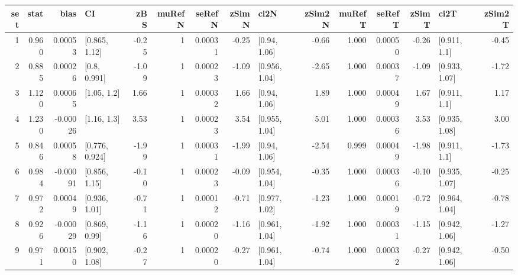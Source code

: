 
\begin{tabular}{r|r|r|l|r|r|r|r|l|r|r|r|r|l|r}
\hline
set & stat & bias & CI & zBS & muRefN & seRefN & zSimN & ci2N & zSim2N & muRefT & seRefT & zSimT & ci2T & zSim2T\\
\hline
1 & 0.960 & 0.00053 & [0.865, 1.12] & -0.25 & 1 & 0.00031 & -0.25 & [0.94, 1.06] & -0.66 & 1.000 & 0.00050 & -0.26 & [0.911, 1.1] & -0.45\\
\hline
2 & 0.885 & 0.00026 & [0.8, 0.991] & -1.09 & 1 & 0.00023 & -1.09 & [0.956, 1.04] & -2.65 & 1.000 & 0.00037 & -1.09 & [0.933, 1.07] & -1.72\\
\hline
3 & 1.120 & 0.00065 & [1.05, 1.2] & 1.66 & 1 & 0.00032 & 1.66 & [0.94, 1.06] & 1.89 & 1.000 & 0.00049 & 1.67 & [0.911, 1.1] & 1.17\\
\hline
4 & 1.230 & -0.00026 & [1.16, 1.3] & 3.53 & 1 & 0.00023 & 3.54 & [0.955, 1.04] & 5.01 & 1.000 & 0.00036 & 3.53 & [0.935, 1.08] & 3.00\\
\hline
5 & 0.846 & 0.00058 & [0.776, 0.924] & -1.99 & 1 & 0.00031 & -1.99 & [0.94, 1.06] & -2.54 & 0.999 & 0.00049 & -1.98 & [0.911, 1.1] & -1.73\\
\hline
6 & 0.984 & -0.00091 & [0.856, 1.15] & -0.10 & 1 & 0.00023 & -0.09 & [0.954, 1.04] & -0.35 & 1.000 & 0.00036 & -0.10 & [0.935, 1.07] & -0.25\\
\hline
7 & 0.972 & 0.00049 & [0.936, 1.01] & -0.71 & 1 & 0.00012 & -0.71 & [0.977, 1.02] & -1.23 & 1.000 & 0.00019 & -0.72 & [0.964, 1.04] & -0.78\\
\hline
8 & 0.926 & -0.00029 & [0.869, 0.99] & -1.16 & 1 & 0.00020 & -1.16 & [0.961, 1.04] & -1.92 & 1.000 & 0.00031 & -1.15 & [0.942, 1.06] & -1.27\\
\hline
9 & 0.971 & 0.00150 & [0.902, 1.08] & -0.27 & 1 & 0.00020 & -0.27 & [0.961, 1.04] & -0.74 & 1.000 & 0.00032 & -0.27 & [0.942, 1.06] & -0.50\\
\hline
\end{tabular}
